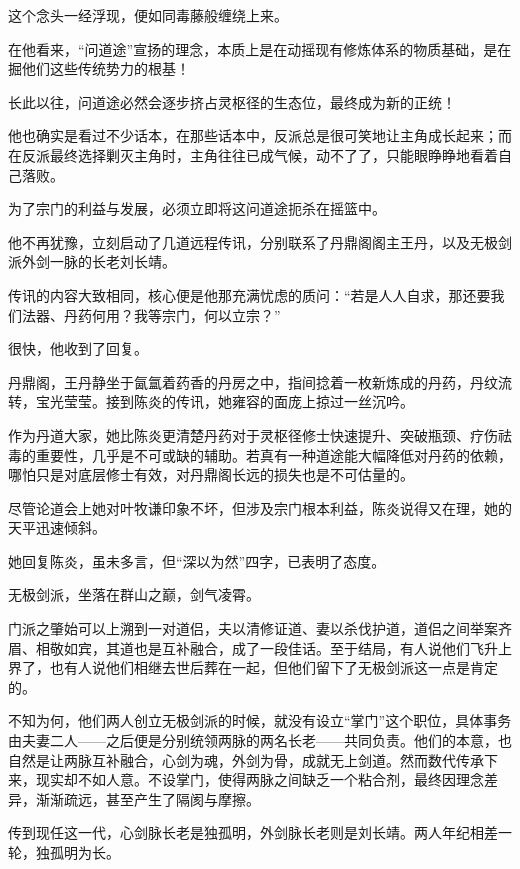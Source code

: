 这个念头一经浮现，便如同毒藤般缠绕上来。

在他看来，“问道途”宣扬的理念，本质上是在动摇现有修炼体系的物质基础，是在掘他们这些传统势力的根基！

长此以往，问道途必然会逐步挤占灵枢径的生态位，最终成为新的正统！

他也确实是看过不少话本，在那些话本中，反派总是很可笑地让主角成长起来；而在反派最终选择剿灭主角时，主角往往已成气候，动不了了，只能眼睁睁地看着自己落败。

为了宗门的利益与发展，必须立即将这问道途扼杀在摇篮中。

他不再犹豫，立刻启动了几道远程传讯，分别联系了丹鼎阁阁主王丹，以及无极剑派外剑一脉的长老刘长靖。

传讯的内容大致相同，核心便是他那充满忧虑的质问：“若是人人自求，那还要我们法器、丹药何用？我等宗门，何以立宗？”

很快，他收到了回复。

\vspace{2em}

丹鼎阁，王丹静坐于氤氲着药香的丹房之中，指间捻着一枚新炼成的丹药，丹纹流转，宝光莹莹。接到陈炎的传讯，她雍容的面庞上掠过一丝沉吟。

作为丹道大家，她比陈炎更清楚丹药对于灵枢径修士快速提升、突破瓶颈、疗伤祛毒的重要性，几乎是不可或缺的辅助。若真有一种道途能大幅降低对丹药的依赖，哪怕只是对底层修士有效，对丹鼎阁长远的损失也是不可估量的。

尽管论道会上她对叶牧谦印象不坏，但涉及宗门根本利益，陈炎说得又在理，她的天平迅速倾斜。

她回复陈炎，虽未多言，但“深以为然”四字，已表明了态度。

\vspace{2em}

无极剑派，坐落在群山之巅，剑气凌霄。

门派之肇始可以上溯到一对道侣，夫以清修证道、妻以杀伐护道，道侣之间举案齐眉、相敬如宾，其道也是互补融合，成了一段佳话。至于结局，有人说他们飞升上界了，也有人说他们相继去世后葬在一起，但他们留下了无极剑派这一点是肯定的。

不知为何，他们两人创立无极剑派的时候，就没有设立“掌门”这个职位，具体事务由夫妻二人——之后便是分别统领两脉的两名长老——共同负责。他们的本意，也自然是让两脉互补融合，心剑为魂，外剑为骨，成就无上剑道。然而数代传承下来，现实却不如人意。不设掌门，使得两脉之间缺乏一个粘合剂，最终因理念差异，渐渐疏远，甚至产生了隔阂与摩擦。

传到现任这一代，心剑脉长老是独孤明，外剑脉长老则是刘长靖。两人年纪相差一轮，独孤明为长。

